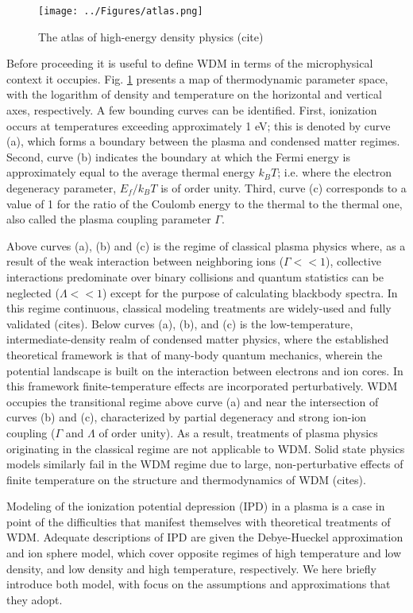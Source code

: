 \documentclass [11pt, proquest, article] {uwthesis}[2016/11/22]
\begin{document}
\begin{figure}[h] 
\caption{The atlas of high-energy density physics (cite)}
\label{fig:atlas}
\centering
\texttt{[image: ../Figures/atlas.png]}
\end{figure}

Before proceeding it is useful to define WDM in terms of the microphysical context it occupies. Fig. \ref{fig:atlas} presents a map of thermodynamic parameter space, with the logarithm of density and temperature on the horizontal and vertical axes, respectively. A few bounding curves can be identified. First, ionization occurs at temperatures exceeding approximately 1 eV; this is denoted by curve (a), which forms a boundary between the plasma and condensed matter regimes. Second, curve (b) indicates the boundary at which the Fermi energy is approximately equal to the average thermal energy $k_BT$; i.e. where the electron degeneracy parameter, $E_f/k_B T$ is of order unity. Third, curve (c) corresponds to a value of 1 for the ratio of the Coulomb energy to the thermal to the thermal one, also called the plasma coupling parameter  $\Gamma$. 

Above curves (a), (b) and (c) is the regime of classical plasma physics where, as a result of the weak interaction between neighboring ions ($\Gamma << 1$), collective interactions predominate over binary collisions and quantum statistics can be neglected ($\Lambda << 1$) except for the purpose of calculating blackbody spectra. In this regime continuous, classical modeling treatments are widely-used and fully validated (cites). Below curves (a), (b), and (c) is the low-temperature, intermediate-density realm of condensed matter physics, where the established theoretical framework is that of many-body quantum mechanics, wherein the potential landscape is built on the interaction between electrons and ion cores. In this framework finite-temperature effects are incorporated perturbatively. WDM occupies the transitional regime above curve (a) and near the intersection of curves (b) and (c), characterized by partial degeneracy and strong ion-ion coupling ($\Gamma$ and $\Lambda$ of order unity). As a result, treatments of plasma physics originating in the classical regime are not applicable to WDM. Solid state physics models similarly fail in the WDM regime due to large, non-perturbative effects of finite temperature on the structure and thermodynamics of WDM (cites).  

Modeling of the ionization potential depression (IPD) in a plasma is a case in point of the difficulties that manifest themselves with theoretical treatments of WDM. Adequate descriptions of IPD are given the Debye-Hueckel approximation and ion sphere model, which cover opposite regimes of high temperature and low density, and low density and high temperature, respectively. We here briefly introduce both model, with focus on the assumptions and approximations that they adopt.
\end{document}
